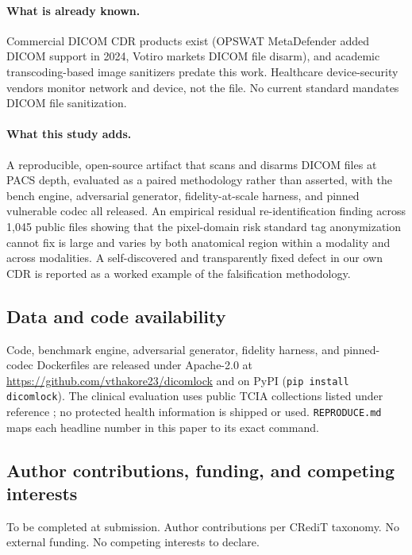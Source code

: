 \documentclass[11pt]{article}
\begin{document}
\paragraph{What is already known.} Commercial DICOM CDR products exist (OPSWAT MetaDefender added DICOM support in 2024, Votiro markets DICOM file disarm), and academic transcoding-based image sanitizers predate this work. Healthcare device-security vendors monitor network and device, not the file. No current standard mandates DICOM file sanitization.

\paragraph{What this study adds.} A reproducible, open-source artifact that scans and disarms DICOM files at PACS depth, evaluated as a paired methodology rather than asserted, with the bench engine, adversarial generator, fidelity-at-scale harness, and pinned vulnerable codec all released. An empirical residual re-identification finding across 1,045 public files showing that the pixel-domain risk standard tag anonymization cannot fix is large and varies by both anatomical region within a modality and across modalities. A self-discovered and transparently fixed defect in our own CDR is reported as a worked example of the falsification methodology.

\subsection{Data and code availability}

Code, benchmark engine, adversarial generator, fidelity harness, and pinned-codec Dockerfiles are released under Apache-2.0 at \url{https://github.com/vthakore23/dicomlock} and on PyPI (\texttt{pip install dicomlock}). The clinical evaluation uses public TCIA collections listed under reference \cite{ref24}; no protected health information is shipped or used. \texttt{REPRODUCE.md} maps each headline number in this paper to its exact command.

\subsection{Author contributions, funding, and competing interests}

To be completed at submission. Author contributions per CRediT taxonomy. No external funding. No competing interests to declare.
\end{document}
